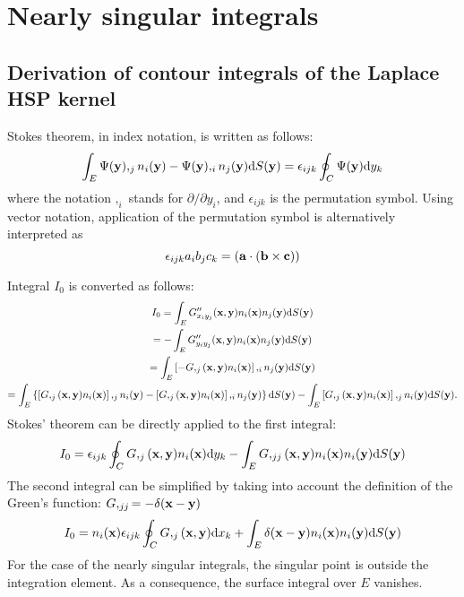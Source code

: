 \appendix

\chapter{Nearly singular integrals}

\section{Derivation of contour integrals of the Laplace HSP kernel}
\label{sec:stokes_laplace_hsp}

Stokes theorem, in index notation, is written as follows:
%
\begin{equation}
	\int_E \Psi({\bf y}),_j n_i({\bf y}) - \Psi({\bf y}),_i n_j({\bf y}) \mathrm{d} S({\bf y}) = \epsilon_{ijk} \oint_C \Psi({\bf y}) \mathrm{d} y_k
\end{equation}
%
where the notation $,_i$ stands for $\partial/\partial y_i$, and $\epsilon_{ijk}$ is the permutation symbol.
Using vector notation, application of the permutation symbol is alternatively interpreted as
%
\begin{equation}
	\epsilon_{ijk} a_i b_j c_k = \left({\bf a} \cdot \left({\bf b} \times {\bf c}\right)\right)
\end{equation}

Integral $I_0$ is converted as follows:
%
\begin{multline}
	I_0
	= \int_E G''_{x_i y_j}({\bf x}, {\bf y}) n_i({\bf x}) n_j({\bf y}) \mathrm{d} S({\bf y}) \\
	= -\int_E G''_{y_i y_j}({\bf x}, {\bf y}) n_i({\bf x}) n_j({\bf y}) \mathrm{d} S({\bf y}) \\
	= \int_E \left[ -G,_j({\bf x}, {\bf y}) n_i({\bf x}) \right],_{i} n_j({\bf y}) \mathrm{d} S({\bf y}) \\
	= \int_E \left\{
		\left[G,_j({\bf x}, {\bf y}) n_i({\bf x}) \right],_{j} n_i({\bf y})
		-\left[G,_j({\bf x}, {\bf y}) n_i({\bf x}) \right],_{i} n_j({\bf y})
	\right\} \mathrm{d} S({\bf y})
	- \int_E \left[G,_j({\bf x}, {\bf y}) n_i({\bf x}) \right],_{j} n_i({\bf y}) \mathrm{d} S({\bf y}).
\end{multline}
%
Stokes' theorem can be directly applied to the first integral:
%
\begin{equation}
	I_0 = \epsilon_{ijk} \oint_C G,_j({\bf x}, {\bf y}) n_i({\bf x}) \mathrm{d} y_k
	- \int_E G,_{jj}({\bf x}, {\bf y}) n_i({\bf x}) n_i({\bf y}) \mathrm{d} S({\bf y})
\end{equation}
%
The second integral can be simplified by taking into account the definition of the Green's function: $G,_{jj} = -\delta({\bf x} - {\bf y})$
%
\begin{equation}
	I_0 = n_i({\bf x}) \epsilon_{ijk} \oint_C G,_j({\bf x}, {\bf y}) \mathrm{d} x_k
	+ \int_E \delta({\bf x} - {\bf y}) n_i({\bf x}) n_i({\bf y}) \mathrm{d} S({\bf y})
\end{equation}
%
For the case of the nearly singular integrals, the singular point is outside the integration element. As a consequence, the surface integral over $E$ vanishes.

